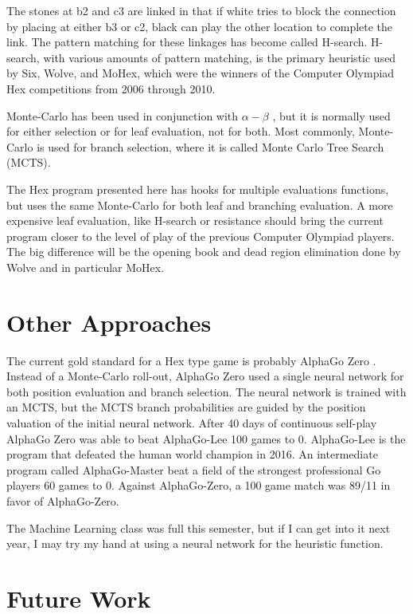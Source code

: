 \documentclass[12pt,titlepage]{amsart}
\begin{document}
The stones at b2 and c3 are linked in that if white tries to block the
connection by placing at either b3 or c2, black can play the other
location to complete the link. The pattern matching for these linkages
has become called H-search. H-search, with various amounts of pattern
matching, is the primary heuristic used by Six, Wolve, and MoHex,
which were the winners of the Computer Olympiad Hex competitions from
2006 through 2010.

Monte-Carlo has been used in conjunction with $\alpha-\beta$
\cite{arneson_hayward_henderson_2010}, but it is normally used for either
selection or for leaf evaluation, not for both. Most commonly, Monte-Carlo is
used for branch selection, where it is called Monte Carlo Tree Search (MCTS).

The Hex program presented here has hooks for multiple evaluations functions, but
uses the same Monte-Carlo for both leaf and branching evaluation. A more
expensive leaf evaluation, like H-search or resistance should bring the current
program closer to the level of play of the previous Computer Olympiad players.
The big difference will be the opening book and dead region elimination done by
Wolve and in particular MoHex.

\section{Other Approaches}

The current gold standard for a Hex type game is probably AlphaGo Zero
\cite{Silver2017}. Instead of a Monte-Carlo roll-out, AlphaGo Zero used a single
neural network for both position evaluation and branch selection. The neural
network is trained with an MCTS, but the MCTS branch probabilities are guided by
the position valuation of the initial neural network. After 40 days of
continuous self-play AlphaGo Zero was able to beat AlphaGo-Lee 100 games to 0.
AlphaGo-Lee is the program that defeated the human world champion in 2016. An
intermediate program called AlphaGo-Master beat a field of the strongest
professional Go players 60 games to 0. Against AlphaGo-Zero, a 100 game match
was 89/11 in favor of AlphaGo-Zero.

The Machine Learning class was full this semester, but if I can get into it next
year, I may try my hand at using a neural network for the heuristic function.

\section{Future Work}
\end{document}
